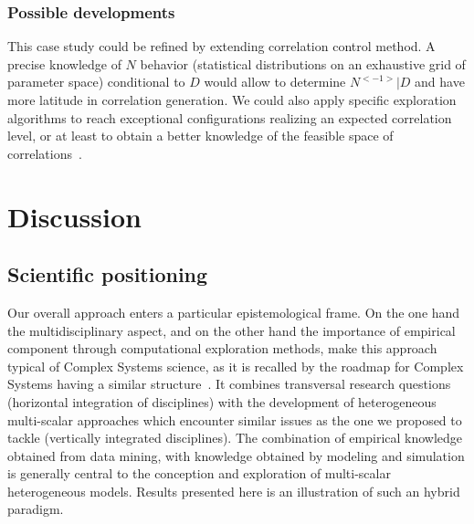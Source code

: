 \subsubsection{Possible developments}


This case study could be refined by extending correlation control method. A precise knowledge of $N$ behavior (statistical distributions on an exhaustive grid of parameter space) conditional to $D$ would allow to determine $N^{<-1>} | D$ and have more latitude in correlation generation. We could also apply specific exploration algorithms to reach exceptional configurations realizing an expected correlation level, or at least to obtain a better knowledge of the feasible space of correlations~\cite{10.1371/journal.pone.0138212}.





\section{Discussion}



\subsection*{Scientific positioning}


Our overall approach enters a particular epistemological frame. On the one hand the multidisciplinary aspect, and on the other hand the importance of empirical component through computational exploration methods, make this approach typical of Complex Systems science, as it is recalled by the roadmap for Complex Systems having a similar structure~\cite{2009arXiv0907.2221B}. It combines transversal research questions (horizontal integration of disciplines) with the development of heterogeneous multi-scalar approaches which encounter similar issues as the one we proposed to tackle (vertically integrated disciplines). The combination of empirical knowledge obtained from data mining, with knowledge obtained by modeling and simulation is generally central to the conception and exploration of multi-scalar heterogeneous models. Results presented here is an illustration of such an hybrid paradigm.


